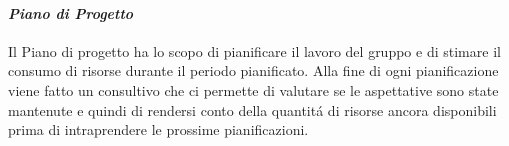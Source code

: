 \paragraph{\textit{Piano di Progetto}}
Il Piano di progetto ha lo scopo di pianificare il lavoro del gruppo e di stimare il consumo di risorse durante il periodo pianificato.
Alla fine di ogni pianificazione viene fatto un consultivo che ci permette di valutare se le aspettative sono state mantenute e quindi di 
rendersi conto della quantitá di risorse ancora disponibili prima di intraprendere le prossime pianificazioni.

